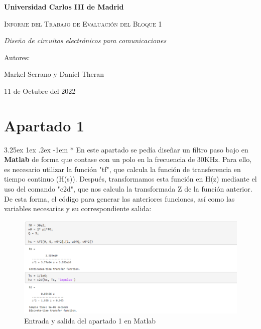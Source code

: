 \documentclass[12pt]{article}
\makeatletter
\renewcommand\paragraph{\@startsection{paragraph}{5}{\z@}%
  {3.25ex \@plus1ex \@minus.2ex}%
  {-1em}%
  {\normalfont\normalsize\bfseries}}
\makeatother
\begin{document}
  \begin{titlepage}
    \centering
   {\bfseries\Large Universidad Carlos III de Madrid \par}
    \vspace{5cm}
    {\scshape\Huge Informe del Trabajo de Evaluación del Bloque 1 \par}
    \vspace{2cm}
    {\itshape\Large Diseño de circuitos electrónicos para comunicaciones}
    \vfill
    {\Large Autores: \par}
    \vspace{1cm}
    {\Large Markel Serrano y Daniel Theran}
    \vfill
    {\Large 11 de Octubre del 2022 \par}
  \end{titlepage}

  \section*{Apartado 1}

    \paragraph*{}
    En este apartado se pedía diseñar un filtro paso bajo en \textbf{Matlab} de forma que contase con un polo en la frecuencia de 30KHz.
    Para ello, es necesario utilizar la función "tf", que calcula la función de transferencia en tiempo continuo (H(s)).
    Después, transformamos esta función en H(z) mediante el uso del comando "c2d", que nos calcula la transformada Z de la función anterior.
    De esta forma, el código para generar las anteriores funciones, así como las variables necesarias y su correspondiente salida:

    \begin{figure}[H]
      \centering
      \includegraphics[width=1\linewidth]{Img/img_apartado_1.PNG}
      \caption{Entrada y salida del apartado 1 en Matlab}%
      \label{fig:img1}
  \end{figure}
\end{document}
